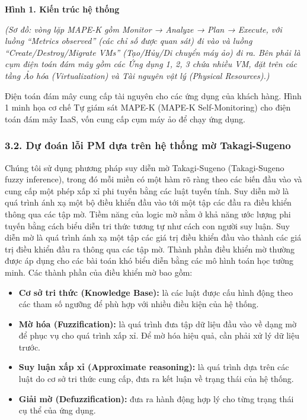 \documentclass[
  vietnamese,
]{article}
\providecommand{\tightlist}{%
  \setlength{\itemsep}{0pt}\setlength{\parskip}{0pt}}
\begin{document}
\textbf{Hình 1. Kiến trúc hệ thống}

\emph{(Sơ đồ: vòng lặp MAPE-K gồm Monitor → Analyze → Plan → Execute,
với luồng ``Metrics observed'' (các chỉ số được quan sát) đi vào và
luồng ``Create/Destroy/Migrate VMs'' (Tạo/Hủy/Di chuyển máy ảo) đi ra.
Bên phải là cụm điện toán đám mây gồm các Ứng dụng 1, 2, 3 chứa nhiều
VM, đặt trên các tầng Ảo hóa (Virtualization) và Tài nguyên vật lý
(Physical Resources).)}

Điện toán đám mây cung cấp tài nguyên cho các ứng dụng của khách hàng.
Hình 1 minh họa cơ chế Tự giám sát MAPE-K (MAPE-K Self-Monitoring) cho
điện toán đám mây IaaS, vốn cung cấp cụm máy ảo để chạy ứng dụng.

\subsubsection{3.2. Dự đoán lỗi PM dựa trên hệ thống mờ
Takagi-Sugeno}\label{dux1ef1-ux111ouxe1n-lux1ed7i-pm-dux1ef1a-truxean-hux1ec7-thux1ed1ng-mux1edd-takagi-sugeno}

Chúng tôi sử dụng phương pháp suy diễn mờ Takagi-Sugeno (Takagi-Sugeno
fuzzy inference), trong đó mỗi miền có một hàm rõ ràng theo các biến đầu
vào và cung cấp một phép xấp xỉ phi tuyến bằng các luật tuyến tính. Suy
diễn mờ là quá trình ánh xạ một bộ điều khiển đầu vào tới một tập các
đầu ra điều khiển thông qua các tập mờ. Tiềm năng của logic mờ nằm ở khả
năng ước lượng phi tuyến bằng cách biểu diễn tri thức tương tự như cách
con người suy luận. Suy diễn mờ là quá trình ánh xạ một tập các giá trị
điều khiển đầu vào thành các giá trị điều khiển đầu ra thông qua các tập
mờ. Thành phần điều khiển mờ thường được áp dụng cho các bài toán khó
biểu diễn bằng các mô hình toán học tường minh. Các thành phần của điều
khiển mờ bao gồm:

\begin{itemize}
\tightlist
\item
  \textbf{Cơ sở tri thức (Knowledge Base):} là các luật được cấu hình
  động theo các tham số ngưỡng để phù hợp với nhiều điều kiện của hệ
  thống.
\item
  \textbf{Mờ hóa (Fuzzification):} là quá trình đưa tập dữ liệu đầu vào
  về dạng mờ để phục vụ cho quá trình xấp xỉ. Để mờ hóa hiệu quả, cần
  phải xử lý dữ liệu trước.
\item
  \textbf{Suy luận xấp xỉ (Approximate reasoning):} là quá trình dựa
  trên các luật do cơ sở tri thức cung cấp, đưa ra kết luận về trạng
  thái của hệ thống.
\item
  \textbf{Giải mờ (Defuzzification):} đưa ra hành động hợp lý cho từng
  trạng thái cụ thể của ứng dụng.
\end{itemize}
\end{document}
